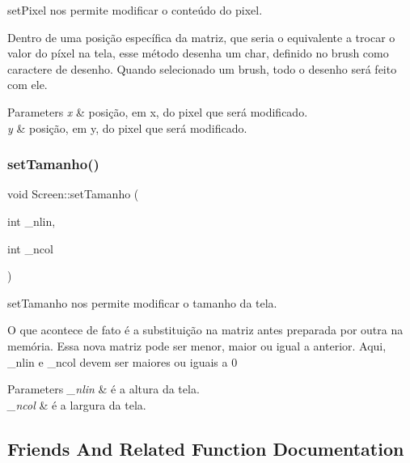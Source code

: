 set\+Pixel nos permite modificar o conteúdo do pixel. 

Dentro de uma posição específica da matriz, que seria o equivalente a trocar o valor do píxel na tela, esse método desenha um char, definido no \textquotesingle{}brush\textquotesingle{} como caractere de desenho. Quando selecionado um brush, todo o desenho será feito com ele. 
\begin{DoxyParams}{Parameters}
{\em x} & posição, em x, do pixel que será modificado. \\
\hline
{\em y} & posição, em y, do pixel que será modificado. \\
\hline
\end{DoxyParams}
\mbox{\label{class_screen_a88e90322ba2f1623b660c424be1c8f84}} 
\subsubsection{\texorpdfstring{set\+Tamanho()}{setTamanho()}}
{\footnotesize\ttfamily void Screen\+::set\+Tamanho (\begin{DoxyParamCaption}\item[{int}]{\+\_\+nlin,  }\item[{int}]{\+\_\+ncol }\end{DoxyParamCaption})}



set\+Tamanho nos permite modificar o tamanho da tela. 

O que acontece de fato é a substituição na matriz antes preparada por outra na memória. Essa nova matriz pode ser menor, maior ou igual a anterior. Aqui, \+\_\+nlin e \+\_\+ncol devem ser maiores ou iguais a 0 
\begin{DoxyParams}{Parameters}
{\em \+\_\+nlin} & é a altura da tela. \\
\hline
{\em \+\_\+ncol} & é a largura da tela. \\
\hline
\end{DoxyParams}


\subsection{Friends And Related Function Documentation}
\mbox{\label{class_screen_aab6a2880746bfe1b7964817cc8f0989e}} 
